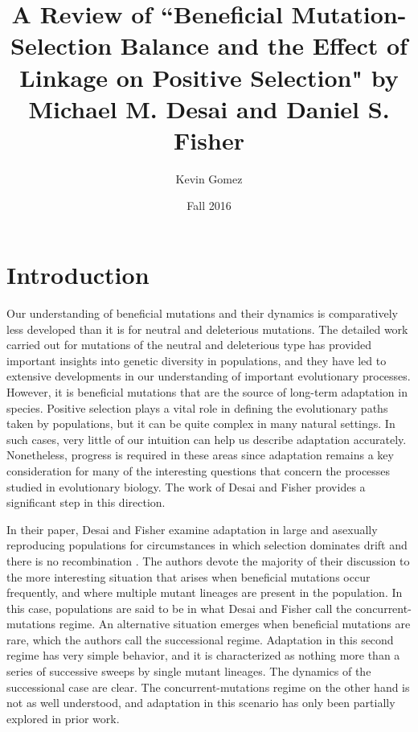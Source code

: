\documentclass[12pt, one column]{article}
\title{A Review of ``Beneficial Mutation-Selection Balance and the Effect of Linkage on Positive Selection" by Michael M. Desai and Daniel S. Fisher}
\date{Fall 2016}
\author{Kevin Gomez}
\begin{document}
\maketitle
\newpage


\newpage
\section*{Introduction}
Our understanding of beneficial mutations and their dynamics is comparatively less developed than it is for neutral and deleterious mutations.  The detailed work carried out for mutations of the neutral and deleterious type has provided important insights into genetic diversity in populations, and they have led to extensive developments in our understanding of important evolutionary processes.  However, it is beneficial mutations that are the source of long-term adaptation in species.  Positive selection plays a vital role in defining the evolutionary paths taken by populations, but it can be quite complex in many natural settings.  In such cases, very little of our intuition can help us describe adaptation accurately.  Nonetheless, progress is required in these areas since adaptation remains a key consideration for many of the interesting questions that concern the processes studied in evolutionary biology.  The work of Desai and Fisher provides a significant step in this direction.

In their paper, Desai and Fisher examine adaptation in large and asexually reproducing populations for circumstances in which selection dominates drift and there is no recombination \cite{DesFish07}.  The authors devote the majority of their discussion to the more interesting situation that arises when beneficial mutations occur frequently, and where multiple mutant lineages are present in the population.  In this case, populations are said to be in what Desai and Fisher call the concurrent-mutations regime.  An alternative situation emerges when beneficial mutations are rare, which the authors call the successional regime.  Adaptation in this second regime has very simple behavior, and it is characterized as nothing more than a series of successive sweeps by single mutant lineages.  The dynamics of the successional case are clear.  The concurrent-mutations regime on the other hand is not as well understood, and adaptation in this scenario has only been partially explored in prior work.
\end{document}
